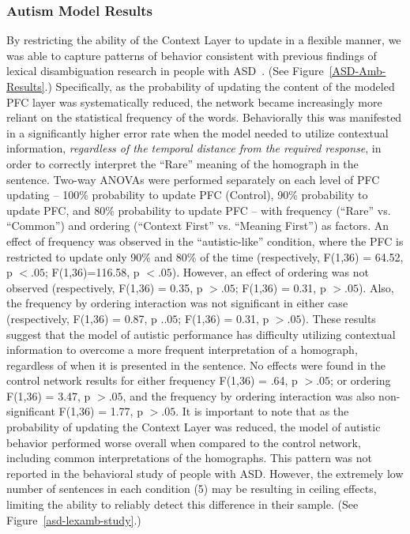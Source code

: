 \subsubsection{Autism Model Results}
By restricting the ability of the Context Layer to update in a flexible manner, we was able to capture patterns of behavior consistent with previous findings of lexical disambiguation research in people with ASD~\cite{RefWorks:103,HappeF:1997:WCC_Homographs}. (See Figure~\ref{ASD-Amb-Results}.) Specifically, as the probability of updating the content of the modeled PFC layer was systematically reduced, the network became increasingly more reliant on the statistical frequency of the words.  Behaviorally this was manifested in a significantly higher error rate when the model needed to utilize contextual information, \emph{regardless of the temporal distance from the required response}, in order to correctly interpret the ``Rare'' meaning of the homograph in the sentence.  Two-way ANOVAs were performed separately on each level of PFC updating  -- 100\% probability to update PFC (Control), 90\% probability to update PFC, and 80\% probability to update PFC -- with frequency (``Rare'' vs. ``Common'') and ordering (``Context First'' vs. ``Meaning First'') as factors.  An effect of frequency was observed in the ``autistic-like'' condition, where the PFC is restricted to update only 90\% and 80\% of the time (respectively, F(1,36) = 64.52, p $< .05$; F(1,36)=116.58, p $< .05$). However, an effect of ordering was not observed (respectively, F(1,36) = 0.35, p $> .05$; F(1,36) = 0.31, p $> .05$). Also, the frequency by ordering interaction was not significant in either case (respectively, F(1,36) = 0.87, p $. .05$; F(1,36) = 0.31, p $> .05$). These results suggest that the model of autistic performance has difficulty utilizing contextual information to overcome a more frequent interpretation of a homograph, regardless of when it is presented in the sentence.  No effects were found in the control network results for either frequency F(1,36) = .64, p $>.05$; or ordering F(1,36) = 3.47, p $>.05$, and the frequency by ordering interaction was also non-significant F(1,36) = 1.77, p $>.05$.  It is important to note that as the probability of updating the Context Layer was reduced, the model of autistic behavior performed worse overall when compared to the control network, including common interpretations of the homographs.   This pattern was not reported in the behavioral study of people with ASD.  However, the extremely low number of sentences in each condition (5) may be resulting in ceiling effects, limiting the ability to reliably detect this difference in their sample. (See Figure~\ref{asd-lexamb-study}.) 

